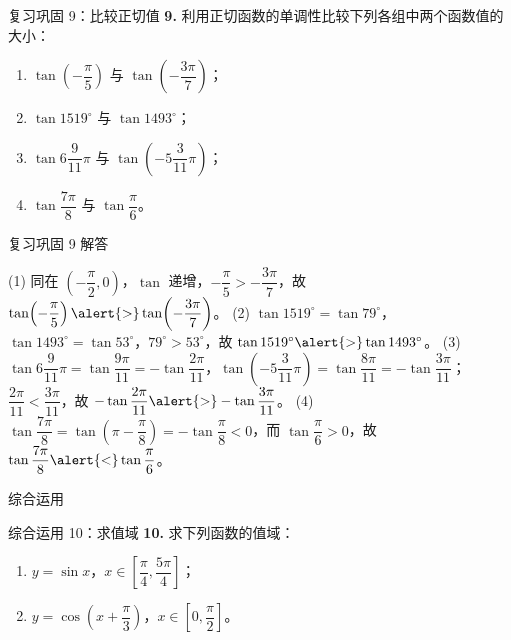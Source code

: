 \documentclass[10pt,aspectratio=169,serif]{beamer}
\begin{document}
\begin{frame}[t]{复习巩固 9：比较正切值}
\textbf{9.} 利用正切函数的单调性比较下列各组中两个函数值的大小：
\begin{enumerate}[(1)]
  \item $\tan\!\left(-\dfrac{\pi}{5}\right)$ 与 $\tan\!\left(-\dfrac{3\pi}{7}\right)$； \qquad
  \item $\tan1519^\circ$ 与 $\tan1493^\circ$；
  \item $\tan6\dfrac{9}{11}\pi$ 与 $\tan\!\left(-5\dfrac{3}{11}\pi\right)$； \qquad
  \item $\tan\dfrac{7\pi}{8}$ 与 $\tan\dfrac{\pi}{6}$。
\end{enumerate}
\end{frame}

\begin{frame}[t]{复习巩固 9 解答}
\begin{tcolorbox}[colback=orange!10,colframe=orange,title=\textbf{解}]
(1) 同在 $\left(-\dfrac\pi2,0\right)$，$\tan$ 递增，$-\dfrac\pi5>-\dfrac{3\pi}{7}$，故 $\tan\!\left(-\dfrac\pi5\right)\alert{>}\tan\!\left(-\dfrac{3\pi}{7}\right)$。
\vspace{0.2em}
(2) $\tan1519^\circ=\tan79^\circ$，$\tan1493^\circ=\tan53^\circ$，$79^\circ>53^\circ$，故 $\tan1519^\circ\alert{>}\tan1493^\circ$。
\vspace{0.2em}
(3) $\tan6\dfrac9{11}\pi=\tan\dfrac{9\pi}{11}=-\tan\dfrac{2\pi}{11}$，$\tan\!\left(-5\dfrac3{11}\pi\right)=\tan\dfrac{8\pi}{11}=-\tan\dfrac{3\pi}{11}$；$\dfrac{2\pi}{11}<\dfrac{3\pi}{11}$，故 $-\tan\dfrac{2\pi}{11}\alert{>}-\tan\dfrac{3\pi}{11}$。
\vspace{0.2em}
(4) $\tan\dfrac{7\pi}{8}=\tan\!\left(\pi-\dfrac\pi8\right)=-\tan\dfrac\pi8<0$，而 $\tan\dfrac\pi6>0$，故 $\tan\dfrac{7\pi}{8}\alert{<}\tan\dfrac\pi6$。
\end{tcolorbox}
\end{frame}

\begin{frame}[c]\Huge\centering 综合运用\end{frame}

\begin{frame}[t]{综合运用 10：求值域}
\textbf{10.} 求下列函数的值域：
\begin{enumerate}[(1)]
  \item $y=\sin x$，$x\in\!\left[\dfrac{\pi}{4},\dfrac{5\pi}{4}\right]$； \qquad
  \item $y=\cos\!\left(x+\dfrac{\pi}{3}\right)$，$x\in\left[0,\dfrac{\pi}{2}\right]$。
\end{enumerate}
\end{frame}
\end{document}
